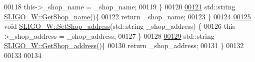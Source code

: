 \begin{DoxyCode}
00118     this->\_shop\_name = \_shop\_name;
00119 \}
00120 
\hypertarget{_s_l_i_g_o___w_8cpp_source.tex_l00121}{}\hyperlink{class_s_l_i_g_o___w_ae788518e30d9d311eb28f37da932367a}{00121} std::string \hyperlink{class_s_l_i_g_o___w_ae788518e30d9d311eb28f37da932367a}{SLIGO\_W::GetShop\_name}()\{
00122     \textcolor{keywordflow}{return} \_shop\_name;
00123 \}
00124 
\hypertarget{_s_l_i_g_o___w_8cpp_source.tex_l00125}{}\hyperlink{class_s_l_i_g_o___w_af442340c69e1f50622014d459320f003}{00125} \textcolor{keywordtype}{void} \hyperlink{class_s_l_i_g_o___w_af442340c69e1f50622014d459320f003}{SLIGO\_W::SetShop\_address}(std::string \_shop\_address) \{
00126     this->\_shop\_address = \_shop\_address;
00127 \}
00128 
\hypertarget{_s_l_i_g_o___w_8cpp_source.tex_l00129}{}\hyperlink{class_s_l_i_g_o___w_a66a2315d531231e34c5056e9bc917797}{00129} std::string \hyperlink{class_s_l_i_g_o___w_a66a2315d531231e34c5056e9bc917797}{SLIGO\_W::GetShop\_address}()\{
00130     \textcolor{keywordflow}{return} \_shop\_address;
00131 \}
00132 
00133 
00134 
\end{DoxyCode}
